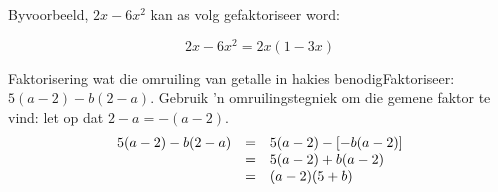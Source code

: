 Byvoorbeeld, $2x-6{x}^{2}$ kan as volg gefaktoriseer word:\par 

\begin{equation*}
2x-6{x}^{2}=2x(1-3x)
\end{equation*}


% 


\begin{wex}{ Faktorisering wat die omruiling van getalle in hakies benodig}{Faktoriseer: $5(a-2)-b(2-a)$. }{
Gebruik 'n omruilingstegniek om die gemene faktor te vind: let op dat $2-a = -(a-2)$.
\begin{equation*}
\begin{array}{ccl}
\hfill 5(a-2)-b(2-a)& =& \hfill 5(a-2)-[-b(a-2)]  \\
&= & 5(a-2)+b(a-2)\\ 
& =& (a-2)(5+b) \hfill
\end{array}
\end{equation*}
}
\end{wex}

% 

